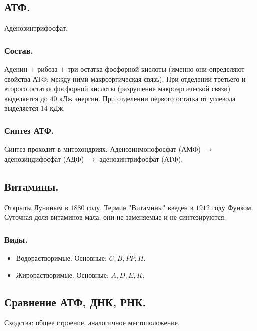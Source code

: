 \documentclass[12pt]{article}
\begin{document}
	\subsection{АТФ.}
	Аденозинтрифосфат.
	\subsubsection{Состав.}
	Аденин + рибоза + три остатка фосфорной кислоты (именно они определяют свойства АТФ; между ними макроэргическая связь). При отделении третьего и второго остатка фосфорной кислоты (разрушение макроэргической связи) выделяется до $40$ кДж энергии. При отделении первого остатка от углевода выделяется $14$ кДж.
	\subsubsection{Синтез АТФ.}
	Синтез проходит в митохондриях. Аденозинмонофосфат (АМФ) $\rightarrow$ аденозиндифосфат (АДФ) $\rightarrow$ аденозинтрифосфат (АТФ).
	\subsection{Витамины.}
	Открыты Луниным в $1880$ году. Термин "Витамины" введен в $1912$ году Функом. \\
	Суточная доля витаминов мала, они не заменяемые и не синтезируются.
	\subsubsection{Виды.}
	\begin{itemize}
		\item Водорастворимые. Основные: $C, B, PP, H$.
		\item Жирорастворимые. Основные: $A, D, E, K$.
	\end{itemize}
	\subsection{Сравнение АТФ, ДНК, РНК.}
	Сходства: общее строение, аналогичное местоположение.
\end{document}
